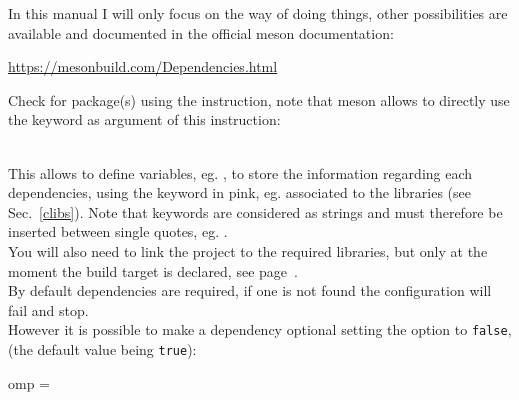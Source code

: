 In this manual I will only focus on the  way of doing things, other possibilities are available and documented in the official meson documentation: 
\begin{center}\href{https://mesonbuild.com/Dependencies.html}{https://mesonbuild.com/Dependencies.html}\end{center}
Check for package(s) using the  instruction, note that meson allows to directly use the  keyword as argument of this instruction:
\begin{script}
 

 
 
 
 


 

\end{script}
\\[-0.25cm]
\noindent This allows to define variables, eg. , to store the information regarding each dependencies, using the keyword in pink, eg.  associated to the  libraries (see Sec.~\ref{clibs}). 
Note that keywords are considered as strings and must therefore be inserted between single quotes, eg. \texttt{}. \\
You will also need to link the project to the required libraries, but only at the moment the build target is declared, see page~\pageref{build_rules_meson}. \\[0.25cm]
By default dependencies are required, if one is not found the configuration will fail and stop. \\
However it is possible to make a dependency optional setting the  option to \texttt{false}, (the default value being \texttt{true}): 
\begin{script}
omp = 
\end{script}

